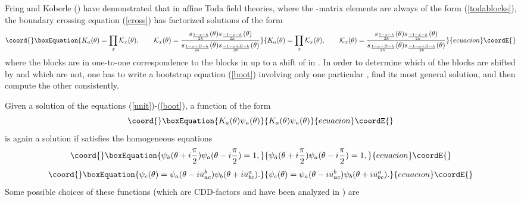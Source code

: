 \documentclass[a4paper,12pt]{report}
\begin{document}
Fring and Koberle (\cite{fring1}) have demonstrated that in affine Toda field theories, where the \coordHE{}-matrix
elements are always of the form (\ref{todablocks}), the boundary crossing equation (\ref{cross}) has factorized
solutions of the form
\begin{equation}\coord{}\boxEquation{\label{K}
K_{a}(\theta)=\prod_{x}{\cal K}_{x}(\theta),\qquad {\cal
K}_{x}(\theta)=\frac{s_{\frac{1-x-h}{2h}}(\theta)s_{\frac{-1-x-h}{2h}}(\theta)}{s_{\frac{1-x-B-h}{2h}}(\theta)s_{\frac{-1-x+B-h}{2h}}(\theta)}
}{K_{a}(\theta)=\prod_{x}{\cal K}_{x}(\theta),\qquad {\cal
K}_{x}(\theta)=\frac{s_{\frac{1-x-h}{2h}}(\theta)s_{\frac{-1-x-h}{2h}}(\theta)}{s_{\frac{1-x-B-h}{2h}}(\theta)s_{\frac{-1-x+B-h}{2h}}(\theta)}
}{ecuacion}\coordE{}\end{equation}
where the blocks \coordHE{} are in one-to-one correspondence to the blocks \coordHE{} in
\coordHE{} up to a shift of \coordHE{} in \coordHE{}. In order to determine which of the blocks are shifted by \coordHE{} and
which are not, one has to write a bootstrap equation (\ref{boot}) involving only one particular \coordHE{},
find its most general solution, and then compute the other \coordHE{} consistently.

\vspace{0.5cm}

Given a solution \coordHE{} of the equations (\ref{unit})-(\ref{boot}), a function of the form
\begin{equation}\coord{}\boxEquation{
K_{a}(\theta)\psi_{a}(\theta)
}{
K_{a}(\theta)\psi_{a}(\theta)
}{ecuacion}\coordE{}\end{equation}
is again a solution if \coordHE{} satisfies the homogeneous equations
\begin{equation}\coord{}\boxEquation{\label{CDD1}
\psi_{\bar{a}}(\theta+i\frac{\pi}{2})\psi_{a}(\theta-i\frac{\pi}{2})=1,
}{\psi_{\bar{a}}(\theta+i\frac{\pi}{2})\psi_{a}(\theta-i\frac{\pi}{2})=1,
}{ecuacion}\coordE{}\end{equation}
\begin{equation}\coord{}\boxEquation{\label{CDD2}
\psi_{c}(\theta)=\psi_{a}(\theta-i\bar{u}_{ac}^{b})\psi_{b}(\theta+i\bar{u}_{bc}^{a}).
}{\psi_{c}(\theta)=\psi_{a}(\theta-i\bar{u}_{ac}^{b})\psi_{b}(\theta+i\bar{u}_{bc}^{a}).
}{ecuacion}\coordE{}\end{equation}
Some possible choices of these functions (which are CDD-factors and have been analyzed in \cite{sas}) are
\end{document}
